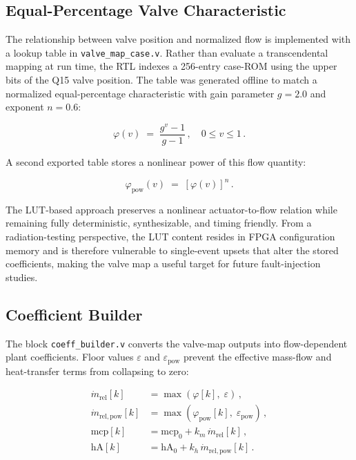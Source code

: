 \subsection{Equal-Percentage Valve Characteristic}
\label{ssec:bench_valve_lut}

The relationship between valve position and normalized flow is
implemented with a lookup table in \texttt{valve\_map\_case.v}.
Rather than evaluate a transcendental mapping at run time, the RTL
indexes a 256-entry case-ROM using the upper bits of the Q15 valve
position.  The table was generated offline to match a normalized
equal-percentage characteristic with gain parameter $g = 2.0$ and
exponent $n = 0.6$:

\begin{equation}
  \varphi(v) \;=\; \frac{g^v - 1}{g - 1} \,, \quad 0 \le v \le 1 \,.
  \label{eq:equal_pct}
\end{equation}

A second exported table stores a nonlinear power of this flow quantity:

\begin{equation}
  \varphi_{\mathrm{pow}}(v) \;=\; \left[\varphi(v)\right]^n \,.
  \label{eq:phi_pow}
\end{equation}

The LUT-based approach preserves a nonlinear actuator-to-flow relation
while remaining fully deterministic, synthesizable, and timing friendly.
From a radiation-testing perspective, the LUT content resides in FPGA
configuration memory and is therefore vulnerable to single-event upsets
that alter the stored coefficients, making the valve map a useful target
for future fault-injection studies.

\subsection{Coefficient Builder}
\label{ssec:bench_coeff}

The block \texttt{coeff\_builder.v} converts the valve-map outputs into
flow-dependent plant coefficients.  Floor values $\varepsilon$ and
$\varepsilon_{\mathrm{pow}}$ prevent the effective mass-flow and
heat-transfer terms from collapsing to zero:

\begin{align}
  \dot{m}_{\mathrm{rel}}[k]     &= \max\!\left(\varphi[k],\; \varepsilon\right) \,, \label{eq:mdot} \\
  \dot{m}_{\mathrm{rel,pow}}[k] &= \max\!\left(\varphi_{\mathrm{pow}}[k],\; \varepsilon_{\mathrm{pow}}\right) \,, \label{eq:mdot_pow} \\
  \mathrm{mcp}[k]  &= \mathrm{mcp}_0 + k_m\,\dot{m}_{\mathrm{rel}}[k] \,, \label{eq:mcp} \\
  \mathrm{hA}[k]   &= \mathrm{hA}_0  + k_h\,\dot{m}_{\mathrm{rel,pow}}[k] \,. \label{eq:hA}
\end{align}


